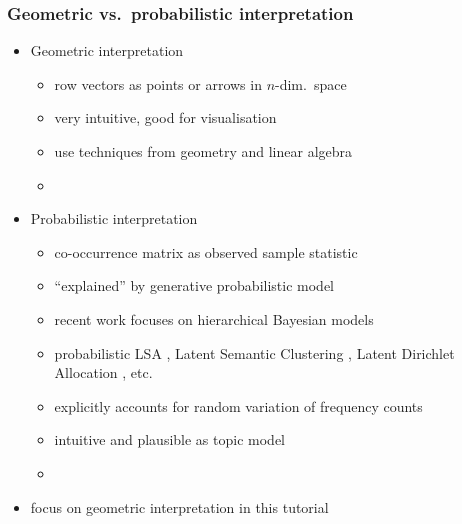 \documentclass[t]{beamer} %
\begin{document}
\begin{frame}
  \frametitle{Geometric vs.\ probabilistic interpretation}

  \begin{itemize}
  \item Geometric interpretation
    \begin{itemize}
    \item row vectors as points or arrows in $n$-dim.\ space
    \item very intuitive, good for visualisation
    \item use techniques from geometry and linear algebra
    \item[]
    \end{itemize}
    \pause
  \item Probabilistic interpretation
    \begin{itemize}
    \item co-occurrence matrix as observed sample statistic
    \item ``explained'' by generative probabilistic model
    \item recent work focuses on hierarchical Bayesian models
    \item probabilistic LSA \citep{Hoffmann:99}, Latent Semantic
      Clustering \citep{Rooth:etc:99}, Latent Dirichlet Allocation
      \citep{Blei:Ng:Jordan:03}, etc.
    \item explicitly accounts for random variation of frequency counts
    \item intuitive and plausible as topic model
    \item[]
    \end{itemize}
    \pause
  \item[\hand] focus on geometric interpretation in this tutorial
  \end{itemize}
\end{frame}

\end{document}
